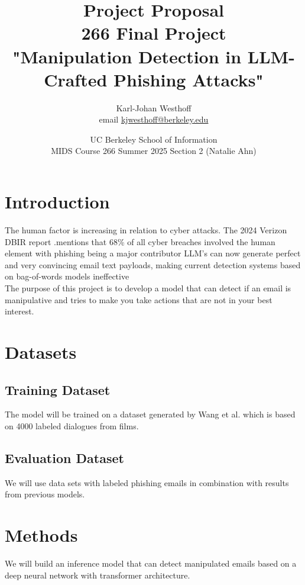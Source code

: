 \documentclass[
	letterpaper, %
	12pt, %
	unnumberedsections, %
	twoside, %
]{LTJournalArticle}
\title{Project Proposal \\ 266 Final Project \\ "Manipulation Detection in LLM-Crafted Phishing Attacks"}  %
\author{
	Karl-Johan Westhoff \\
	email \href{mailto:kjwesthoff@berkeley.edu}{kjwesthoff@berkeley.edu}
}
\date{UC Berkeley School of Information \\
MIDS Course 266 Summer 2025 Section 2 (Natalie Ahn) \\
}
\begin{document}
\maketitle %





\section{Introduction}
The human factor is increasing in relation to cyber attacks. The 2024 Verizon DBIR report \cite{verizon2024dbir}.mentions that 68\% of all cyber breaches involved the human element with phishing being a major contributor LLM's can now generate perfect and very convincing email text payloads, making current detection systems based on bag-of-words models ineffective\\
The purpose of this project is to develop a model that can detect if an email is manipulative and tries to make you take actions that are not in your best interest.

\section{Datasets}

\subsection{Training Dataset}
The model will be trained on a dataset generated by Wang et al. \cite{MentalManip} which is based on 4000 labeled dialogues from films.\\

\subsection{Evaluation Dataset}
We will use data sets with labeled phishing emails in combination with results from previous models.

\section{Methods}
We will build an inference model that can detect manipulated emails based on a deep neural network with transformer architecture.
\end{document}
